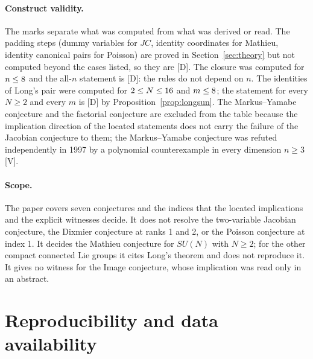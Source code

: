\documentclass[11pt]{article}
\theoremstyle{remark}
\begin{document}
\paragraph{Construct validity.} The marks separate what was computed from what was derived or read. The padding steps (dummy variables for $JC$, identity coordinates for Mathieu, identity canonical pairs for Poisson) are proved in Section~\ref{sec:theory} but not computed beyond the cases listed, so they are [D]. The closure was computed for $n\le8$ and the all-$n$ statement is [D]: the rules do not depend on $n$. The identities of Long's pair were computed for $2\le N\le16$ and $m\le8$; the statement for every $N\ge2$ and every $m$ is [D] by Proposition~\ref{prop:longsun}. The Markus--Yamabe conjecture and the factorial conjecture are excluded from the table because the implication direction of the located statements does not carry the failure of the Jacobian conjecture to them; the Markus--Yamabe conjecture was refuted independently in 1997 by a polynomial counterexample in every dimension $n\ge3$ \cite[abstract, p.~1; Theorem~1.1, p.~2 of the authors' copy]{Cima1997} [V].

\paragraph{Scope.} The paper covers seven conjectures and the indices that the located implications and the explicit witnesses decide. It does not resolve the two-variable Jacobian conjecture, the Dixmier conjecture at ranks 1 and 2, or the Poisson conjecture at index 1. It decides the Mathieu conjecture for $SU(N)$ with $N\ge2$; for the other compact connected Lie groups it cites Long's theorem and does not reproduce it. It gives no witness for the Image conjecture, whose implication was read only in an abstract.

\section{Reproducibility and data availability}\label{sec:repro}
\end{document}
